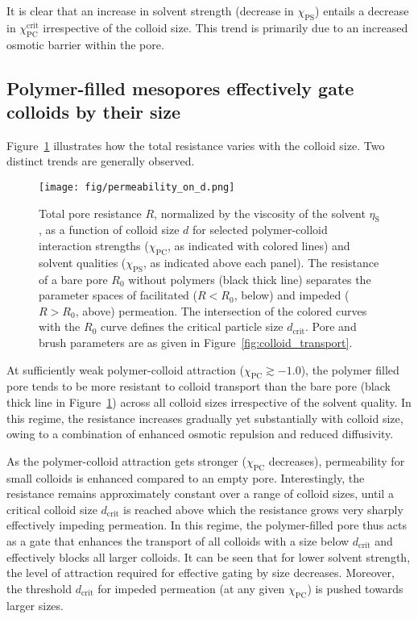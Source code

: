 \documentclass[12pt, a4paper]{article}
\begin{document}
It is clear that an increase in solvent strength (decrease in $\chi_{\text{PS}}$) entails a decrease in $\chi_{\text{PC}}^{\text{crit}}$ irrespective of the colloid size. This trend is primarily due to an increased osmotic barrier within the pore.


\subsection{Polymer-filled mesopores effectively gate colloids by their size}

Figure~\ref{fig:R_vs_d} illustrates how the total resistance varies with the colloid size. 
Two distinct trends are generally observed.

\begin{figure}
    \centering
    \texttt{[image: fig/permeability\_on\_d.png]}
    \caption{
    Total pore resistance $R$, normalized by the viscosity of the solvent $\eta_\text{S}$, as a function of colloid size $d$ for selected polymer-colloid interaction strengths ($\chi_{\text{PC}}$, as indicated with colored lines) and solvent qualities ($\chi_{\text{PS}}$, as indicated above each panel). 
    The resistance of a bare pore $R_{0}$ without polymers (black thick line) separates the parameter spaces of facilitated ($R < R_{0}$, below) and impeded ($R > R_{0}$, above) permeation.
    The intersection of the colored curves with the $R_{0}$ curve defines the critical particle size $d_{\text{crit}}$.
    Pore and brush parameters are as given in Figure~\ref{fig:colloid_transport}. 
    }
    \label{fig:R_vs_d}
\end{figure}

At sufficiently weak polymer-colloid attraction ($\chi_{\text{PC}} \gtrsim -1.0$), the polymer filled pore tends to be more resistant to colloid transport than the bare pore (black thick line in Figure~\ref{fig:R_vs_d}) across all colloid sizes irrespective of the solvent quality.
In this regime, the resistance increases gradually yet substantially with colloid size, owing to a combination of enhanced osmotic repulsion and reduced diffusivity.

As the polymer-colloid attraction gets stronger ($\chi_{\text{PC}}$ decreases), permeability for small colloids is enhanced compared to an empty pore. 
Interestingly, the resistance remains approximately constant over a range of colloid sizes, until a critical colloid size $d_{\text{crit}}$ is reached above which the resistance grows very sharply effectively impeding permeation. 
In this regime, the polymer-filled pore thus acts as a gate that enhances the transport of all colloids with a size below $d_{\text{crit}}$ and effectively blocks all larger colloids.
It can be seen that for lower solvent strength, the level of attraction required for effective gating by size decreases. 
Moreover, the threshold $d_{\text{crit}}$ for impeded permeation (at any given $\chi_{\text{PC}}$) is pushed towards larger sizes.
\end{document}
